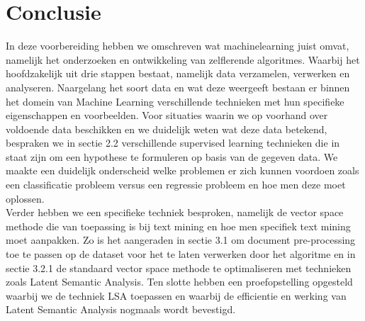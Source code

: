 \chapter{Conclusie}\label{Conclusie}

In deze voorbereiding hebben we omschreven wat machinelearning juist omvat, namelijk het onderzoeken en ontwikkeling van zelflerende algoritmes. Waarbij het hoofdzakelijk uit drie stappen bestaat, namelijk data verzamelen, verwerken en analyseren. Naargelang het soort data en wat deze weergeeft bestaan er binnen het domein van Machine Learning verschillende technieken met hun specifieke eigenschappen en voorbeelden.  Voor situaties waarin we op voorhand over voldoende data beschikken en we duidelijk weten wat deze data betekend, bespraken we in sectie 2.2 verschillende supervised learning technieken die in staat zijn om een hypothese te formuleren op basis van de gegeven data. We maakte een duidelijk onderscheid welke problemen er zich kunnen voordoen zoals een classificatie probleem versus een regressie probleem en hoe men deze moet oplossen.\\
Verder hebben we een specifieke techniek besproken, namelijk de vector space methode die van toepassing is bij text mining en hoe men specifiek text mining moet aanpakken. Zo is het aangeraden  in sectie 3.1 om document pre-processing toe te passen op de dataset voor het te laten verwerken door het algoritme en in sectie 3.2.1 de standaard vector space methode te optimaliseren met technieken zoals Latent Semantic Analysis. Ten slotte hebben een proefopstelling opgesteld waarbij we de techniek LSA toepassen en  waarbij de efficientie en werking van Latent Semantic Analysis nogmaals wordt bevestigd.

